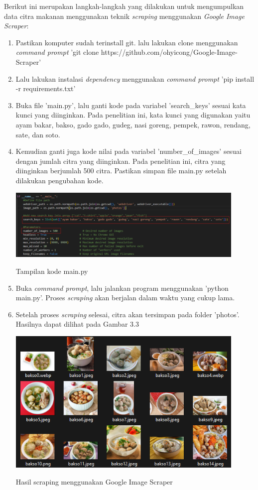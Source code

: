 Berikut ini merupakan langkah-langkah yang dilakukan untuk mengumpulkan data citra makanan menggunakan teknik \textit{scraping} menggunakan \textit{Google Image Scraper}:
\begin{enumerate}
    \item Pastikan komputer sudah terinstall git. lalu lakukan clone menggunakan \textit{command prompt} 'git clone https://github.com/ohyicong/Google-Image-Scraper'
    \item Lalu lakukan instalasi \textit{dependency} menggunakan \textit{command prompt} 'pip install -r requirements.txt'
    \item Buka file 'main.py', lalu ganti kode pada variabel 'search\_keys' sesuai kata kunci yang diinginkan. Pada penelitian ini, kata kunci yang digunakan yaitu ayam bakar, bakso, gado gado, gudeg, nasi goreng, pempek, rawon, rendang, sate, dan soto.
    \item Kemudian ganti juga kode nilai pada variabel 'number\_of\_images' sesuai dengan jumlah citra yang diinginkan. Pada penelitian ini, citra yang diinginkan berjumlah 500 citra. Pastikan simpan file main.py setelah dilakukan pengubahan kode.
    \begin{afigure}
        \includegraphics[width=0.9\textwidth, center]{images/kode1.png}
        \caption{Tampilan kode main.py}
        \label{fig:main.py}
    \end{afigure}
    \item Buka \textit{command prompt}, lalu jalankan program menggunakan 'python main.py'. Proses \textit{scraping} akan berjalan dalam waktu yang cukup lama.
    \item Setelah proses \textit{scraping} selesai, citra akan tersimpan pada folder 'photos'. Hasilnya dapat dilihat pada Gambar 3.3
    \begin{afigure}
        \includegraphics[width=0.9\textwidth, center]{images/kode2.png}
        \caption{Hasil scraping menggunakan Google Image Scraper}
        \label{fig:scraping}
    \end{afigure}
\end{enumerate}

